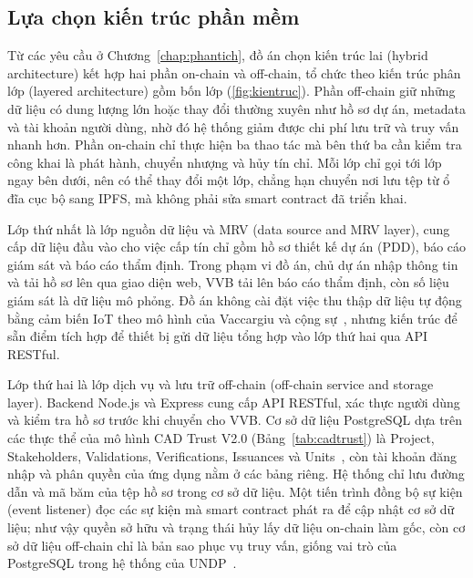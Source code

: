 \subsection*{Lựa chọn kiến trúc phần mềm}
\label{sec:kientruc}

Từ các yêu cầu ở Chương~\ref{chap:phantich}, đồ án chọn kiến trúc lai (hybrid architecture) kết hợp hai phần on-chain và off-chain, tổ chức theo kiến trúc phân lớp (layered architecture) gồm bốn lớp (\autoref{fig:kientruc}). Phần off-chain giữ những dữ liệu có dung lượng lớn hoặc thay đổi thường xuyên như hồ sơ dự án, metadata và tài khoản người dùng, nhờ đó hệ thống giảm được chi phí lưu trữ và truy vấn nhanh hơn. Phần on-chain chỉ thực hiện ba thao tác mà bên thứ ba cần kiểm tra công khai là phát hành, chuyển nhượng và hủy tín chỉ. Mỗi lớp chỉ gọi tới lớp ngay bên dưới, nên có thể thay đổi một lớp, chẳng hạn chuyển nơi lưu tệp từ ổ đĩa cục bộ sang IPFS, mà không phải sửa smart contract đã triển khai.

Lớp thứ nhất là lớp nguồn dữ liệu và MRV (data source and MRV layer), cung cấp dữ liệu đầu vào cho việc cấp tín chỉ gồm hồ sơ thiết kế dự án (PDD), báo cáo giám sát và báo cáo thẩm định. Trong phạm vi đồ án, chủ dự án nhập thông tin và tải hồ sơ lên qua giao diện web, VVB tải lên báo cáo thẩm định, còn số liệu giám sát là dữ liệu mô phỏng. Đồ án không cài đặt việc thu thập dữ liệu tự động bằng cảm biến IoT theo mô hình của Vaccargiu và cộng sự~\cite{vaccargiu2026blockchain}, nhưng kiến trúc để sẵn điểm tích hợp để thiết bị gửi dữ liệu tổng hợp vào lớp thứ hai qua API RESTful.

Lớp thứ hai là lớp dịch vụ và lưu trữ off-chain (off-chain service and storage layer). Backend Node.js và Express cung cấp API RESTful, xác thực người dùng và kiểm tra hồ sơ trước khi chuyển cho VVB. Cơ sở dữ liệu PostgreSQL dựa trên các thực thể của mô hình CAD Trust V2.0 (Bảng~\ref{tab:cadtrust}) là Project, Stakeholders, Validations, Verifications, Issuances và Units~\cite{cadtrust2025datamodel}, còn tài khoản đăng nhập và phân quyền của ứng dụng nằm ở các bảng riêng. Hệ thống chỉ lưu đường dẫn và mã băm của tệp hồ sơ trong cơ sở dữ liệu. Một tiến trình đồng bộ sự kiện (event listener) đọc các sự kiện mà smart contract phát ra để cập nhật cơ sở dữ liệu; như vậy quyền sở hữu và trạng thái hủy lấy dữ liệu on-chain làm gốc, còn cơ sở dữ liệu off-chain chỉ là bản sao phục vụ truy vấn, giống vai trò của PostgreSQL trong hệ thống của UNDP~\cite{undp2024nationalregistry}.

